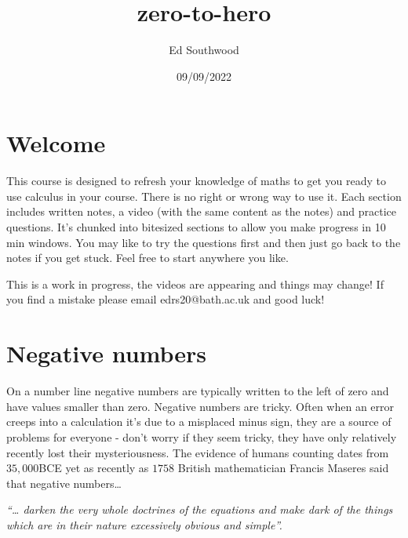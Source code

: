 \documentclass[
  a4paper,
]{scrbook}
\title{zero-to-hero}
\author{Ed Southwood}
\date{09/09/2022}
\renewcommand*\contentsname{Table of contents}
\newcommand\contentsname{Table of contents}
\begin{document}
\frontmatter
\maketitle
\ifdefined\Shaded\renewenvironment{Shaded}{\begin{tcolorbox}[sharp corners, boxrule=0pt, borderline west={3pt}{0pt}{shadecolor}, breakable, frame hidden, enhanced, interior hidden]}{\end{tcolorbox}}\fi

\renewcommand*\contentsname{Table of contents}
{
\setcounter{tocdepth}{2}
\tableofcontents
}
\mainmatter
{}

\hypertarget{welcome}{%
\chapter*{Welcome}\label{welcome}}

This course is designed to refresh your knowledge of maths to get you
ready to use calculus in your course. There is no right or wrong way to
use it. Each section includes written notes, a video (with the same
content as the notes) and practice questions. It's chunked into
bitesized sections to allow you make progress in 10 min windows. You may
like to try the questions first and then just go back to the notes if
you get stuck. Feel free to start anywhere you like.

This is a work in progress, the videos are appearing and things may
change! If you find a mistake please email edrs20@bath.ac.uk and good
luck!


\hypertarget{negative-numbers}{%
\chapter{Negative numbers}\label{negative-numbers}}

On a number line negative numbers are typically written to the left of
zero and have values smaller than zero. Negative numbers are tricky.
Often when an error creeps into a calculation it's due to a misplaced
minus sign, they are a source of problems for everyone - don't worry if
they seem tricky, they have only relatively recently lost their
mysteriousness. The evidence of humans counting dates from \(35,000\)BCE
yet as recently as \(1758\) British mathematician Francis Maseres said
that negative numbers\ldots{}

\emph{``\ldots{} darken the very whole doctrines of the equations and
make dark of the things which are in their nature excessively obvious
and simple''.}
\end{document}
